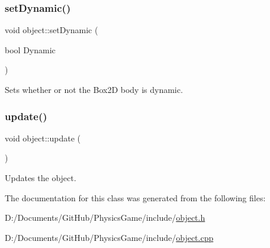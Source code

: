 \subsubsection{\texorpdfstring{set\+Dynamic()}{setDynamic()}}
{\footnotesize\ttfamily void object\+::set\+Dynamic (\begin{DoxyParamCaption}\item[{bool}]{Dynamic }\end{DoxyParamCaption})}



Sets whether or not the Box2D body is dynamic. 

\mbox{\label{classobject_a7fdffa65c5bb1322d322d7e7056fa31f}} 
\subsubsection{\texorpdfstring{update()}{update()}}
{\footnotesize\ttfamily void object\+::update (\begin{DoxyParamCaption}{ }\end{DoxyParamCaption})}



Updates the object. 



The documentation for this class was generated from the following files\+:\begin{DoxyCompactItemize}
\item 
D\+:/\+Documents/\+Git\+Hub/\+Physics\+Game/include/\hyperlink{object_8h}{object.\+h}\item 
D\+:/\+Documents/\+Git\+Hub/\+Physics\+Game/include/\hyperlink{object_8cpp}{object.\+cpp}\end{DoxyCompactItemize}
